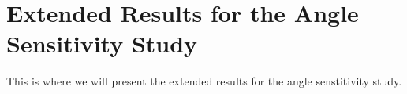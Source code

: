 \section{Extended Results for the Angle Sensitivity Study}
\label{sec:extendedangle}

This is where we will present the extended results for the angle senstitivity
study.
